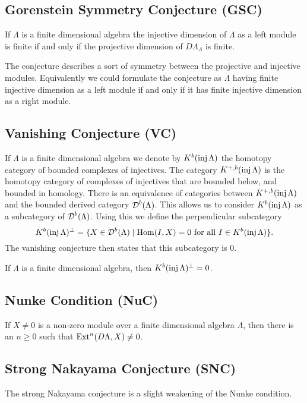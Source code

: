 \subsection*{Gorenstein Symmetry Conjecture (GSC)}
\begin{conj} 
	If $\Lambda$ is a finite dimensional algebra the injective dimension of $\Lambda$ as a left module is finite if and only if the projective dimension of $D\Lambda_\Lambda$ is finite.
\end{conj}

The conjecture describes a sort of symmetry between the projective and injective modules. Equivalently we could formulate the conjecture as $\Lambda$ having finite injective dimension as a left module if and only if it has finite injective dimension as a right module.

\subsection*{Vanishing Conjecture (VC)}
If $\Lambda$ is a finite dimensional algebra we denote by $K^b(\operatorname{inj} \Lambda)$ the homotopy category of bounded complexes of injectives. The category $K^{+,b}(\operatorname{inj}\Lambda)$ is the homotopy category of complexes of injectives that are bounded below, and bounded in homology. There is an equivalence of categories between $K^{+,b}(\operatorname{inj}\Lambda)$ and the bounded derived category $\operatorname{\mathcal{D}}^b(\Lambda)$. This allows us to consider $K^b(\operatorname{inj}\Lambda)$ as a subcategory of $\operatorname{\mathcal{D}}^b(\Lambda)$. Using this we define the perpendicular subcategory
$$K^b(\operatorname{inj}\Lambda)^\perp = \{X \in \operatorname{\mathcal{D}}^b(\Lambda) \mid \operatorname{Hom}(I, X)=0 \text{ for all } I \in K^b(\operatorname{inj}\Lambda)\}.$$
The vanishing conjecture then states that this subcategory is 0.
\begin{conj} 
	If $\Lambda$ is a finite dimensional algebra, then $K^b(\operatorname{inj}\Lambda)^\perp = 0$.
\end{conj}

\subsection*{Nunke Condition (NuC)}
\begin{conj} 
	If $X \neq 0$ is a non-zero module over a finite dimensional algebra $\Lambda$, then there is an $n \geq 0$ such that $\operatorname{Ext}^n(D\Lambda, X) \neq 0$. 
\end{conj}

\subsection*{Strong Nakayama Conjecture (SNC)}
The strong Nakayama conjecture is a slight weakening of the Nunke condition.

